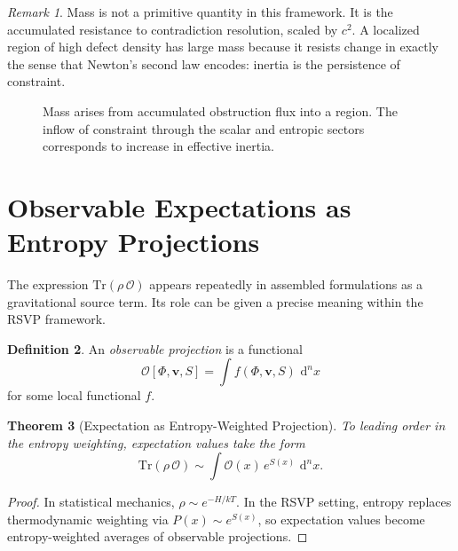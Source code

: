 \documentclass[12pt,a4paper,openany]{book}
\theoremstyle{plain}
\newtheorem{theorem}{Theorem}[chapter]
\theoremstyle{definition}
\newtheorem{definition}[theorem]{Definition}
\theoremstyle{remark}
\newtheorem{remark}[theorem]{Remark}
\newcommand{\dvol}{\,\mathrm{d}^n x}
\newcommand{\RSVPContours}[2]{%
  \foreach \r in {0.45,0.90,1.35,1.80}{%
    \draw[rsvp scalar] (#1,#2) circle (\r);}}
\newcommand{\RSVPFlowRing}[3]{%
  \foreach \ang in {0,45,...,315}{%
    \draw[rsvp flow]
      ({#1 + #3*cos(\ang)},{#2 + #3*sin(\ang)})
      -- ++({-0.35*sin(\ang)},{0.35*cos(\ang)});}}
\begin{document}
\begin{remark}
Mass is not a primitive quantity in this framework. It is the accumulated resistance to contradiction resolution, scaled by $c^2$. A localized region of high defect density has large mass because it resists change in exactly the sense that Newton's second law encodes: inertia is the persistence of constraint.
\end{remark}

\begin{figure}[h]
\centering
{}
\caption[Mass as obstruction flux]{Mass arises from accumulated obstruction flux into a region. The inflow of constraint through the scalar and entropic sectors corresponds to increase in effective inertia.}
\label{fig:mass_flux}
\end{figure}

\section{Observable Expectations as Entropy Projections}

The expression $\mathrm{Tr}(\rho\,\mathcal{O})$ appears repeatedly in assembled formulations as a gravitational source term. Its role can be given a precise meaning within the RSVP framework.

\begin{definition}
An \emph{observable projection} is a functional
\[
\mathcal{O}[\Phi,\mathbf{v},S] = \int f(\Phi,\mathbf{v},S)\,\dvol
\]
for some local functional $f$.
\end{definition}

\begin{theorem}[Expectation as Entropy-Weighted Projection]
\label{thm:entropy_projection}
To leading order in the entropy weighting, expectation values take the form
\[
\mathrm{Tr}(\rho\,\mathcal{O}) \sim \int \mathcal{O}(x)\,e^{S(x)}\,\dvol.
\]
\end{theorem}

\begin{proof}
In statistical mechanics, $\rho \sim e^{-H/kT}$. In the RSVP setting, entropy replaces thermodynamic weighting via $P(x) \sim e^{S(x)}$, so expectation values become entropy-weighted averages of observable projections.
\end{proof}
\end{document}
